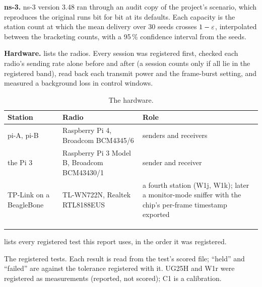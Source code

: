 \documentclass[11pt,a4paper]{article}
\begin{document}
\textbf{ns-3.} ns-3 version 3.48 \cite{nsnam} ran through an audit copy of the project's scenario,
which reproduces the original runs bit for bit at its defaults. Each capacity is the station count
at which the mean delivery over 30 seeds crosses $1-\varepsilon$, interpolated between the bracketing
counts, with a 95\,\% confidence interval from the seeds.

\textbf{Hardware.}  lists the radios. Every session was registered first, checked
each radio's sending rate alone before and after (a session counts only if all lie in the
registered band), read back each transmit power and the frame-burst setting, and measured a
background loss in control windows.

\begin{table}[htbp]
\centering\small
\begin{tabularx}{\textwidth}{>{\raggedright\arraybackslash}p{2.6cm}>{\raggedright\arraybackslash}p{3.8cm}L}
\toprule
Station & Radio & Role \\
\midrule
pi-A, pi-B & Raspberry Pi 4, Broadcom BCM4345/6 & senders and receivers \\
the Pi 3 & Raspberry Pi 3 Model B, Broadcom BCM43430/1 & sender and receiver \\
TP-Link on a BeagleBone & TL-WN722N, Realtek RTL8188EUS & a fourth station (W1j, W1k); later a monitor-mode sniffer with the chip's per-frame timestamp exported \\
\midrule
{} \\
 \\
 \\
\bottomrule
\end{tabularx}
\caption{The hardware.}
\label{tab:hwsetup}
\end{table}

 lists every registered test this report uses, in the order it was
registered.

\begin{table}[htbp]
\centering\footnotesize

\caption{The registered tests. Each result is read from the test's scored file; ``held'' and
``failed'' are against the tolerance registered with it. UG25H and W1r were registered as
measurements (reported, not scored); C1 is a calibration.}
\label{tab:registered}
\end{table}
\end{document}
